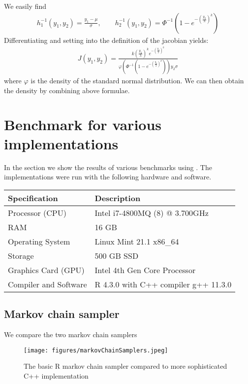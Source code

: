 We easily find
\begin{align}
    h_1^{-1}(y_1, y_2) = \frac{y_1-\mu}{\sigma}, \qquad 
    h_2^{-1}(y_1, y_2) = \Phi^{-1}\left(1-e^{-\left(\frac{y_2}{\lambda}\right)^k}\right) 
\end{align}
Differentiating and setting into the definition of the jacobian yields:
\begin{align}
    J(y_1, y_2) = \frac{k\left(\frac{y_2}{\lambda}\right)^ke^{-\left(\frac{y_2}{\lambda}\right)^k}}{\varphi\left(\Phi^{-1}\left(1-e^{-\left(\frac{y_2}{\lambda}\right)^k}\right)\right)y_2\sigma }    
\end{align}
where $\varphi$ is the density of the standard normal distribution. We can then obtain the density by combining above formulae.
\newpage
\section{Benchmark for various implementations}
In the section we show the results of various benchmarks using \cite{microbenchmark}. The implementations were run with the following hardware and software.
\begin{table}[ht]
    \centering
    \begin{tabular}{ll}
      \hline
      \textbf{Specification} & \textbf{Description} \\
      \hline
      Processor (CPU) & Intel i7-4800MQ (8) @ 3.700GHz \\
      RAM & 16 GB \\
      Operating System & Linux Mint 21.1 x86\_64 \\
      Storage & 500 GB SSD \\
      Graphics Card (GPU) & Intel 4th Gen Core Processor \\
      Compiler and Software & R 4.3.0 with C++ compiler g++ 11.3.0\\
      \hline
    \end{tabular}
  \end{table}
  
\subsection{Markov chain sampler}
We compare the two markov chain samplers
\begin{figure}[h!]
    \centering
    \texttt{[image: figures/markovChainSamplers.jpeg]}
    \caption{The basic R markov chain sampler compared to more sophisticated C++ implementation}
    \label{markovChainRvRcpp}
\end{figure} 
